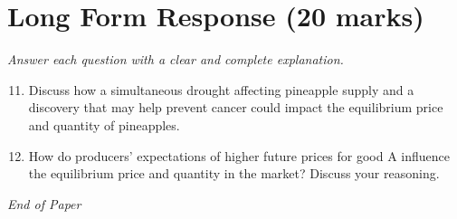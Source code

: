\documentclass[12pt]{article}
\begin{document}
\section*{Long Form Response (20 marks)}
\textit{Answer each question with a clear and complete explanation.}
\begin{enumerate}[label=\arabic*.]
\setcounter{enumi}{10}
\item Discuss how a simultaneous drought affecting pineapple supply and a discovery that may
help prevent cancer could impact the equilibrium price and quantity of pineapples.
\item How do producers' expectations of higher future prices for good A influence the
equilibrium price and quantity in the market? Discuss your reasoning.
\end{enumerate}

\vfill
\noindent\textit{End of Paper}
\end{document}
